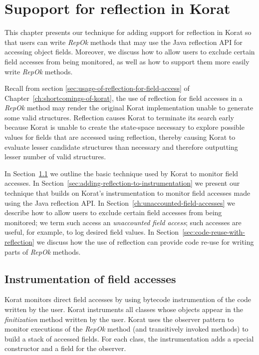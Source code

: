 \chapter{Supoport for reflection in Korat}
\label{ch:adding-reflection}
This chapter presents our technique for adding support for reflection
in Korat so that users can write \emph{RepOk} methods that may use the Java
reflection API for accessing object fields.  Moreover, we discuss how
to allow users to exclude certain field accesses from being monitored,
as well as how to support them more easily write \emph{RepOk} methods.

Recall from section \ref{sec:usage-of-reflection-for-field-access} of
Chapter~\ref{ch:shortcomings-of-korat}, the use of reflection for
field accesses in a \emph{RepOk} method may render the original Korat
implementation unable to generate some valid structures.  Reflection
causes Korat to terminate its search early because Korat is unable to
create the state-space necessary to explore possible values for fields
that are accessed using reflection, thereby causing Korat to evaluate
lesser candidate structures than necessary and therefore outputting
lesser number of valid structures.

\para In Section~\ref{sec:instrumentation-of-field-accesses} we
outline the basic technique used by Korat to monitor field accesses.
In Section~\ref{sec:adding-reflection-to-instrumentation} we present
our technique that builds on Korat's instrumentation to monitor field
accesses made using the Java reflection API. In
Section~\ref{ch:unaccounted-field-accesses} we describe how to allow
users to exclude certain field accesses from being monitored; we term
such access an \emph{unaccounted field access}; such accesses are
useful, for example, to log desired field values.  In
Section~\ref{sec:code-reuse-with-reflection} we discuss how the use of
reflection can provide code re-use for writing parts of \emph{RepOk} methods.

\section{Instrumentation of field accesses}
\label{sec:instrumentation-of-field-accesses}
Korat monitors direct field accesses by using bytecode instrumention
of the code written by the user.  Korat instruments all classes whose
objects appear in the \emph{finitization} method written by the
user. Korat uses the observer pattern \cite{gamma1994design} to
monitor executions of the \emph{RepOk} method (and transitively
invoked methods) to build a stack of accessed fields. For each class,
the instrumentation adds a special constructor and a field for the
observer.

